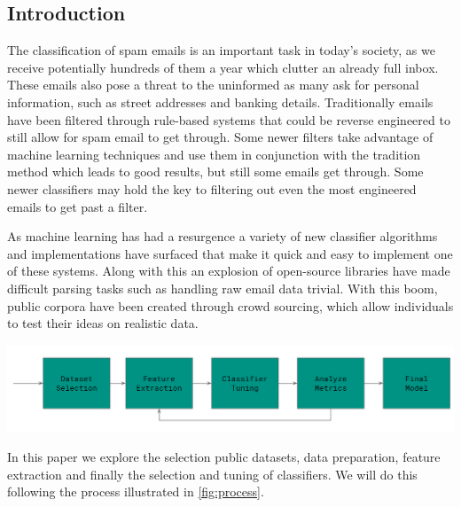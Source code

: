 \documentclass[12pt]{article}
\newenvironment{Figure}
  {\par\medskip\noindent\minipage{\linewidth}}
  {\endminipage\par\medskip}
\begin{document}
    \begin{multicols}{2}
        \section{Introduction}
            The classification of spam emails is an important task in today's society,
            as we receive potentially hundreds of them a year which clutter
            an already full inbox. These emails also pose a threat to the uninformed
            as many ask for personal information, such as street addresses and banking details.
            Traditionally emails have been filtered through rule-based systems that
            could be reverse engineered to still allow for spam email to get through.
            Some newer filters take advantage of machine learning techniques and use
            them in conjunction with the tradition method which leads to good results,
            but still some emails get through. Some newer classifiers may hold the
            key to filtering out even the most engineered emails to get past a filter.
            
            
            As machine learning has had a resurgence a variety
            of new classifier algorithms and implementations have surfaced that 
            make it quick and easy to implement one of these systems. Along with this
            an explosion of open-source libraries have made difficult parsing tasks
            such as handling raw email data trivial. With this boom, public corpora
            have been created through crowd sourcing, which allow individuals to
            test their ideas on realistic data.

            \begin{Figure}
                \centering
                \includegraphics[width=\linewidth]{figures/process.png}
                \label{fig:process}
            \end{Figure}


            In this paper we explore the selection public datasets, data preparation,
            feature extraction and finally the selection and tuning of classifiers.
            We will do this following the process illustrated in \autoref{fig:process}.

\end{multicols}
\end{document}
